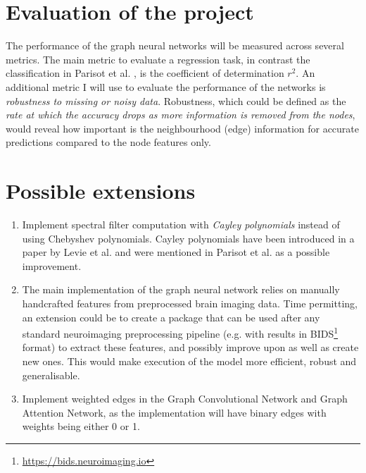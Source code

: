 \documentclass[12pt,a4paper,twoside]{article}
\begin{document}
\section*{Evaluation of the project}
The performance of the graph neural networks will be measured across several metrics. The main metric to evaluate a regression task, in contrast the classification in Parisot et al. \cite{parisot2018disease}, is the coefficient of determination $r^2$. An additional metric I will use to evaluate the performance of the networks is \textit{robustness to missing or noisy data}. Robustness, which could be defined as the \textit{rate at which the accuracy drops as more information is removed from the nodes}, would reveal how important is the neighbourhood (edge) information for accurate predictions compared to the node features only.

\section*{Possible extensions}
\begin{enumerate}[label=PE\arabic*.]
  \item Implement spectral filter computation with \textit{Cayley polynomials} instead of using Chebyshev polynomials. Cayley polynomials have been introduced in a paper by Levie et al. \cite{levie2017cayleynets} and were mentioned in Parisot et al. \cite{parisot2018disease} as a possible improvement.
  \item The main implementation of the graph neural network relies on manually handcrafted features from preprocessed brain imaging data. Time permitting, an extension could be to create a package that can be used after any standard neuroimaging preprocessing pipeline (e.g. with results in BIDS\footnote{\url{https://bids.neuroimaging.io}} format) to extract these features, and possibly improve upon as well as create new ones. This would make execution of the model more efficient, robust and generalisable.
  \item Implement weighted edges in the Graph Convolutional Network and Graph Attention Network, as the implementation will have binary edges with weights being either 0 or 1.

\end{enumerate}
\end{document}
